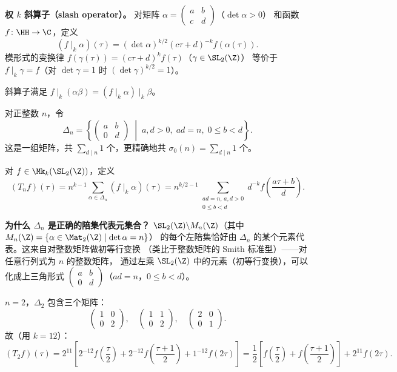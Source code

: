 \textbf{权 $k$ 斜算子（slash operator）。}
对矩阵 $\alpha = \begin{pmatrix} a & b \\ c & d \end{pmatrix}$（$\det\alpha > 0$）
和函数 $f\colon \HH \to \C$，定义
\[
  (f \mid_k \alpha)(\tau) = (\det\alpha)^{k/2}(c\tau + d)^{-k} f(\alpha(\tau)).
\]
模形式的变换律 $f(\gamma(\tau)) = (c\tau+d)^k f(\tau)$（$\gamma \in \SL_2(\Z)$）
等价于 $f \mid_k \gamma = f$（对 $\det\gamma = 1$ 时 $(\det\gamma)^{k/2} = 1$）。

斜算子满足 $f \mid_k (\alpha\beta) = (f \mid_k \alpha) \mid_k \beta$。

\begin{definition}
\label{def:hecke-operator-full}
对正整数 $n$，令
\[
  \Delta_n = \left\{
    \begin{pmatrix} a & b \\ 0 & d \end{pmatrix}
    \;\middle|\; a, d > 0,\; ad = n,\; 0 \leq b < d
  \right\}.
\]
这是一组矩阵，共 $\sum_{d \mid n} 1$ 个，更精确地共 $\sigma_0(n) = \sum_{d \mid n} 1$ 个。

对 $f \in \Mk_k(\SL_2(\Z))$，定义
\[
  (T_n f)(\tau) = n^{k-1} \sum_{\alpha \in \Delta_n} (f \mid_k \alpha)(\tau)
  = n^{k/2-1} \sum_{\substack{ad=n,\, a,d>0 \\ 0 \leq b < d}}
    d^{-k} f\!\left(\frac{a\tau + b}{d}\right).
\]
\end{definition}



\textbf{为什么 $\Delta_n$ 是正确的陪集代表元集合？}
$\SL_2(\Z) \backslash M_n(\Z)$（其中 $M_n(\Z) = \{\alpha \in \Mat_2(\Z) \mid \det\alpha = n\}$）
的每个左陪集恰好由 $\Delta_n$ 的某个元素代表。这来自对整数矩阵做初等行变换
（类比于整数矩阵的 Smith 标准型）——对任意行列式为 $n$ 的整数矩阵，
通过左乘 $\SL_2(\Z)$ 中的元素（初等行变换），可以化成上三角形式
$\begin{pmatrix} a & b \\ 0 & d \end{pmatrix}$（$ad = n$，$0 \leq b < d$）。

\begin{example}[$T_2$ 的显式公式（$k = 12$，作用在 $\Delta$）]
\label{ex:T2-on-Delta}
$n = 2$，$\Delta_2$ 包含三个矩阵：
\[
  \begin{pmatrix}1&0\\0&2\end{pmatrix},\quad
  \begin{pmatrix}1&1\\0&2\end{pmatrix},\quad
  \begin{pmatrix}2&0\\0&1\end{pmatrix}.
\]
故（用 $k = 12$）：
\[
  (T_2 f)(\tau)
  = 2^{11}\left[
    2^{-12}f\!\left(\frac{\tau}{2}\right)
    + 2^{-12}f\!\left(\frac{\tau+1}{2}\right)
    + 1^{-12}f(2\tau)
  \right]
  = \frac{1}{2}\left[f\!\left(\frac{\tau}{2}\right)
    + f\!\left(\frac{\tau+1}{2}\right)\right] + 2^{11} f(2\tau).
\]
\end{example}

